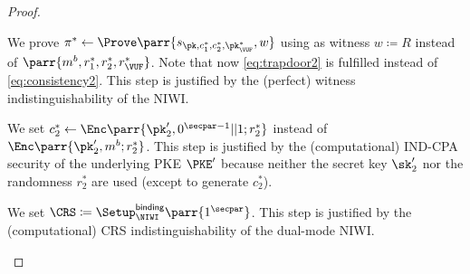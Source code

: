 \begin{proof}
\begin{hybrids}
        \item We prove \(\pi^* \gets \Prove\parr{s_{\pk,c^*_1,c^*_2,\pk^*_\VUF},w}\) using as witness \(w \coloneqq R\) instead of \(\parr{m^b,r^*_1,r^*_2,r^*_\VUF}\).
        Note that now \cref{eq:trapdoor2} is fulfilled instead of \cref{eq:consistency2}.
        This step is justified by the (perfect) witness indistinguishability of the NIWI.

        \item We set \(c^*_2 \gets \Enc\parr{\pk'_2,0^{\secpar-1}||1;r^*_2}\) instead of \(\Enc\parr{\pk'_2,m^b;r^*_2}\).
        This step is justified by the (computational) IND-CPA security of the underlying PKE \(\PKE'\) because neither the secret key \(\sk'_2\) nor the randomness \(r^*_2\) are used (except to generate \(c^*_2\)).

        \item We set \(\CRS \coloneqq \Setup^{\textsf{binding}}_\NIWI\parr{1^\secpar}\).
        This step is justified by the (computational) CRS indistinguishability of the dual-mode NIWI.


\end{hybrids}
\end{proof}
